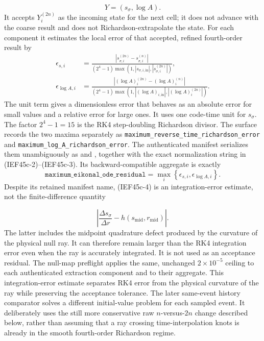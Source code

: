 \[
        Y=(s_\sigma,\log A).
\]
It accepts \(Y_i^{(2n)}\) as the incoming state for the next cell; it does not
advance with the coarse result and does not Richardson-extrapolate the state.
For each component it estimates the local error of that accepted, refined
fourth-order result by
\begin{align}
 \epsilon_{s,i}
 &=\frac{\left|s_{\sigma,i}^{(2n)}-s_{\sigma,i}^{(n)}\right|}
 {\left(2^4-1\right)
  \max\!\left(1,
       \left|s_{\sigma,i,\mathrm{in}}\right|,
       \left|s_{\sigma,i}^{(2n)}\right|\right)},                 \tag{IEF45c-2}\\
 \epsilon_{\log A,i}
 &=\frac{\left|\left(\log A\right)_i^{(2n)}
                    -\left(\log A\right)_i^{(n)}\right|}
 {\left(2^4-1\right)
  \max\!\left(1,
       \left|\left(\log A\right)_{i,\mathrm{in}}\right|,
       \left|\left(\log A\right)_i^{(2n)}\right|\right)} .       \tag{IEF45c-3}
\end{align}
The unit term gives a dimensionless error that behaves as an absolute error
for small values and a relative error for large ones.  It uses one code-time
unit for \(s_\sigma\).  The factor \(2^4-1=15\) is the RK4
step-doubling Richardson divisor.  The surface records the two maxima
separately as
\texttt{maximum\_reverse\_time\_richardson\_error} and
\texttt{maximum\_log\_A\_richardson\_error}.  The authenticated manifest
serializes them unambiguously as
 and
, together with the exact
normalization string in (IEF45c-2)--(IEF45c-3).  Its backward-compatible
aggregate is exactly
\[
 \texttt{maximum\_eikonal\_ode\_residual}
 =\max_i\left\{\epsilon_{s,i},\epsilon_{\log A,i}\right\}.       \tag{IEF45c-4}
\]
Despite its retained manifest name, (IEF45c-4) is an integration-error
estimate, not the finite-difference quantity

\[
 \left|\frac{\Delta s_\sigma}{\Delta r}
              -h(s_{\mathrm{mid}},r_{\mathrm{mid}})\right| .     \tag{IEF45c-5}
\]
The latter includes the midpoint quadrature defect produced by the curvature
of the physical null ray.  It can therefore remain larger than the RK4
integration error even when the ray is accurately integrated.  It is not used as an acceptance residual.
The null-map preflight applies the same, unchanged \(2\times10^{-5}\)
ceiling to each authenticated extraction component and to their aggregate.
This integration-error estimate separates RK4 error from the physical
curvature of the ray while preserving the acceptance tolerance.  The later same-event history comparator solves a
different initial-value problem for each sampled event.  It deliberately
uses the still more conservative raw \(n\)-versus-\(2n\) change described
below, rather than assuming that a ray crossing time-interpolation knots is
already in the smooth fourth-order Richardson regime.

